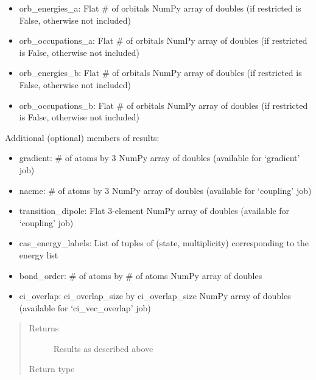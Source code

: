 \documentclass[letterpaper,10pt,english]{sphinxmanual}
\begin{document}
\begin{fulllineitems}
\begin{fulllineitems}
\begin{itemize}
\item {} 
orb\_energies\_a:     Flat \# of orbitals NumPy array of doubles (if restricted is False, otherwise not included)

\item {} 
orb\_occupations\_a:  Flat \# of orbitals NumPy array of doubles (if restricted is False, otherwise not included)

\item {} 
orb\_energies\_b:     Flat \# of orbitals NumPy array of doubles (if restricted is False, otherwise not included)

\item {} 
orb\_occupations\_b:  Flat \# of orbitals NumPy array of doubles (if restricted is False, otherwise not included)

\end{itemize}

Additional (optional) members of results:
\begin{itemize}
\item {} 
gradient:           \# of atoms by 3 NumPy array of doubles (available for ‘gradient’ job)

\item {} 
nacme:              \# of atoms by 3 NumPy array of doubles (available for ‘coupling’ job)

\item {} 
transition\_dipole:  Flat 3-element NumPy array of doubles (available for ‘coupling’ job)

\item {} 
cas\_energy\_labels:  List of tuples of (state, multiplicity) corresponding to the energy list

\item {} 
bond\_order:         \# of atoms by \# of atoms NumPy array of doubles

\item {} 
ci\_overlap:         ci\_overlap\_size by ci\_overlap\_size NumPy array of doubles (available for ‘ci\_vec\_overlap’ job)

\end{itemize}
\begin{quote}\begin{description}
\item[{Returns}] \leavevmode
Results as described above

\item[{Return type}] \leavevmode
{}


\end{description}
\end{quote}
\end{fulllineitems}
\end{fulllineitems}
\end{document}
